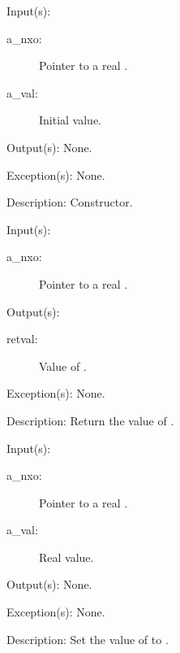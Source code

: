\begin{capi}
\label{nxo_real_new}
	\begin{capilist}
	\item[Input(s): ]
		\begin{description}\item[]
		\item[a\_nxo: ]
			Pointer to a real .
		\item[a\_val: ]
			Initial value.
		\end{description}
	\item[Output(s): ] None.
	\item[Exception(s): ] None.
	\item[Description: ]
		Constructor.
	\end{capilist}
\label{nxo_real_get}
	\begin{capilist}
	\item[Input(s): ]
		\begin{description}\item[]
		\item[a\_nxo: ]
			Pointer to a real \classname{nxo}.
		\end{description}
	\item[Output(s): ]
		\begin{description}\item[]
		\item[retval: ]
			Value of \cvar{a\_nxo}.
		\end{description}
	\item[Exception(s): ] None.
	\item[Description: ]
		Return the value of \cvar{a\_nxo}.
	\end{capilist}
\label{nxo_real_set}
	\begin{capilist}
	\item[Input(s): ]
		\begin{description}\item[]
		\item[a\_nxo: ]
			Pointer to a real .
		\item[a\_val: ]
			Real value.
		\end{description}
	\item[Output(s): ] None.
	\item[Exception(s): ] None.
	\item[Description: ]
		Set the value of  to \cvar{a\_val}.
	\end{capilist}
\end{capi}
